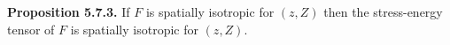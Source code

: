 \textbf{Proposition 5.7.3.} If $F$ is spatially isotropic for $(z, Z)$ then the stress-energy tensor of $F$ is spatially isotropic for $(z, Z)$.
